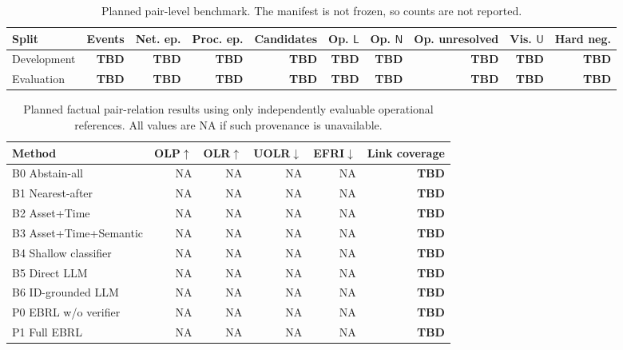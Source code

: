 \documentclass[conference]{IEEEtran}
\newcommand{\NA}{\textsc{NA}}
\newcommand{\TBDv}{\textbf{TBD}}
\begin{document}
\begin{table}[t]
\caption{Planned pair-level benchmark. The manifest is not frozen, so counts are not reported.}
\label{tab:composition}
\centering\scriptsize
\begin{tabular}{lrrrrrrrrr}
\toprule
Split & Events & Net. ep. & Proc. ep. & Candidates & Op. $\mathsf{L}$ & Op. $\mathsf{N}$ & Op. unresolved & Vis. $\mathsf{U}$ & Hard neg.\\
\midrule
Development & \TBDv & \TBDv & \TBDv & \TBDv & \TBDv & \TBDv & \TBDv & \TBDv & \TBDv\\
Evaluation & \TBDv & \TBDv & \TBDv & \TBDv & \TBDv & \TBDv & \TBDv & \TBDv & \TBDv\\
\bottomrule
\end{tabular}
\end{table}

\begin{table}[t]
\caption{Planned factual pair-relation results using only independently evaluable operational references. All values are \NA{} if such provenance is unavailable.}
\label{tab:factual-results}
\centering\scriptsize
\begin{tabular}{lrrrrr}
\toprule
Method & OLP$\uparrow$ & OLR$\uparrow$ & UOLR$\downarrow$ & EFRI$\downarrow$ & Link coverage\\
\midrule
B0 Abstain-all & \NA & \NA & \NA & \NA & \TBDv\\
B1 Nearest-after & \NA & \NA & \NA & \NA & \TBDv\\
B2 Asset+Time & \NA & \NA & \NA & \NA & \TBDv\\
B3 Asset+Time+Semantic & \NA & \NA & \NA & \NA & \TBDv\\
B4 Shallow classifier & \NA & \NA & \NA & \NA & \TBDv\\
B5 Direct LLM & \NA & \NA & \NA & \NA & \TBDv\\
B6 ID-grounded LLM & \NA & \NA & \NA & \NA & \TBDv\\
P0 EBRL w/o verifier & \NA & \NA & \NA & \NA & \TBDv\\
P1 Full EBRL & \NA & \NA & \NA & \NA & \TBDv\\
\bottomrule
\end{tabular}
\end{table}
\end{document}
